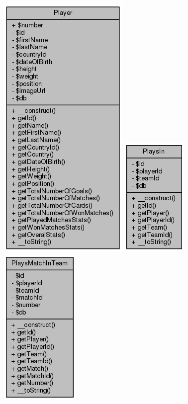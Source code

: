\documentclass[11pt]{article}
\begin{document}
\includegraphics[scale=0.4]{UML_Player.png}
\includegraphics[scale=0.4]{UML_PlaysIn.png}
\includegraphics[scale=0.4]{UML_PlaysMatchInTeam.png}
\end{document}
